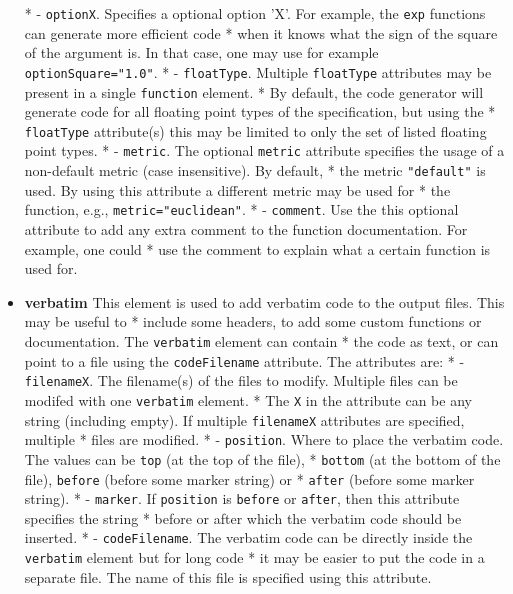 \documentclass[10pt, a4paper]{article}
\begin{document}
\begin{itemize}
 *        - {\tt optionX}. Specifies a optional option 'X'. For example, the {\tt exp} functions can generate more efficient code
 *           when it knows what the sign of the square of the argument is. In that case, one may use for example {\tt optionSquare="1.0"}.
 *        - {\tt floatType}. Multiple {\tt floatType} attributes may be present in a single {\tt function} element. 
 *          By default, the code generator will generate code for all floating point types of the specification, but using the 
 *          {\tt floatType} attribute(s) this may be limited to only the set of listed floating point types.
 *        - {\tt metric}. The optional {\tt metric} attribute specifies the usage of a non-default metric (case insensitive). By default,
 *          the metric {\tt "default"} is used. By using this attribute a different metric may be used for
 *          the function, e.g., {\tt metric="euclidean"}.
 *        - {\tt comment}. Use the this optional attribute to add any extra comment to the function documentation. For example, one could
 *          use the comment to explain what a certain function is used for.
\item {\bf verbatim} This element is used to add verbatim code to the output files. This may be useful to
 *     include some headers, to add some custom functions or documentation. The {\tt verbatim} element can contain
 *     the code as text, or can point to a file using the {\tt codeFilename} attribute. The attributes are:
 *        - {\tt filenameX}. The filename(s) of the files to modify. Multiple files can be modifed with one {\tt verbatim} element.
 *        The {\tt X} in the attribute can be any string (including empty). If multiple {\tt filenameX} attributes are specified, multiple
 *        files are modified.
 *        - {\tt position}. Where to place the verbatim code. The values can be {\tt top} (at the top of the file), 
 *           {\tt bottom} (at the bottom of the file), {\tt before} (before some marker string) or
 *           {\tt after} (before some marker string).
 *        - {\tt marker}. If {\tt position} is {\tt before} or {\tt after}, then this attribute specifies the string
 *           before or after which the verbatim code should be inserted.
 *        - {\tt codeFilename}. The verbatim code can be directly inside the {\tt verbatim} element but for long code
 *           it may be easier to put the code in a separate file. The name of this file is specified using this attribute.
 \end{itemize}
 
\end{document}
